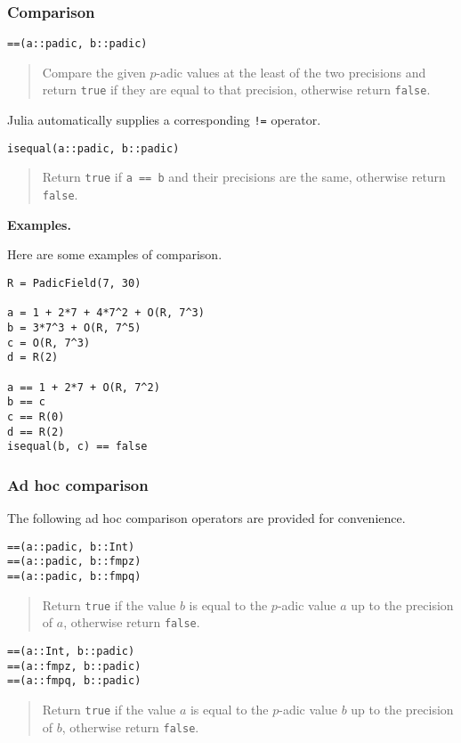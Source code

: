 \documentclass[a4paper,10pt]{article}
\newcommand{\code}{\lstinline}
\newcommand{\desc}[1]{\vspace{-3mm}\begin{quote}#1\end{quote}}
\begin{document}
{{\subsubsection{Comparison}

\begin{lstlisting}
==(a::padic, b::padic)
\end{lstlisting}

\desc{Compare the given $p$-adic values at the least of the two precisions and
return \code{true} if they are equal to that precision, otherwise return
\code{false}.}

Julia automatically supplies a corresponding \code{!=} operator.

\begin{lstlisting}
isequal(a::padic, b::padic)
\end{lstlisting}

\desc{Return \code{true} if \code{a == b} and their precisions are the same,
otherwise return \code{false}.}

\textbf{Examples.}

Here are some examples of comparison.

\begin{lstlisting}
R = PadicField(7, 30)

a = 1 + 2*7 + 4*7^2 + O(R, 7^3)
b = 3*7^3 + O(R, 7^5)
c = O(R, 7^3)
d = R(2)

a == 1 + 2*7 + O(R, 7^2)
b == c
c == R(0)
d == R(2)
isequal(b, c) == false
\end{lstlisting}

\subsubsection{Ad hoc comparison}

The following ad hoc comparison operators are provided for convenience. 

\begin{lstlisting}
==(a::padic, b::Int)
==(a::padic, b::fmpz)
==(a::padic, b::fmpq)
\end{lstlisting}

\desc{Return \code{true} if the value $b$ is equal to the $p$-adic 
value $a$ up to the precision of $a$, otherwise return \code{false}.}

\begin{lstlisting}
==(a::Int, b::padic)
==(a::fmpz, b::padic)
==(a::fmpq, b::padic)
\end{lstlisting}

\desc{Return \code{true} if the value $a$ is equal to the $p$-adic 
value $b$ up to the precision of $b$, otherwise return \code{false}.}

}}
\end{document}
